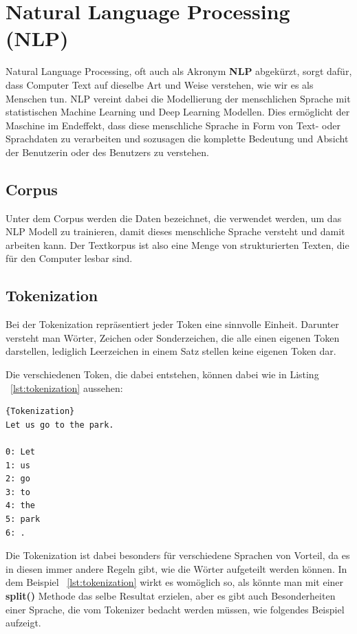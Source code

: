 \section{Natural Language Processing (NLP)}

Natural Language Processing, oft auch als Akronym \textbf{NLP} abgekürzt, sorgt dafür, dass Computer Text auf dieselbe Art und Weise verstehen, wie wir es als Menschen tun.
NLP vereint dabei die Modellierung der menschlichen Sprache mit statistischen Machine Learning und Deep Learning Modellen.
Dies ermöglicht der Maschine im Endeffekt, dass diese menschliche Sprache in Form von Text- oder Sprachdaten zu verarbeiten und sozusagen die komplette Bedeutung und Absicht der Benutzerin oder des Benutzers zu verstehen.\cite{naturalLanguageProcessingIBM}

\subsection{Corpus}

Unter dem Corpus werden die Daten bezeichnet, die verwendet werden, um das NLP Modell zu trainieren, damit dieses menschliche Sprache versteht und damit arbeiten kann.
Der Textkorpus ist also eine Menge von strukturierten Texten, die für den Computer lesbar sind.\cite{corpus}


\subsection{Tokenization}

Bei der Tokenization repräsentiert jeder Token eine sinnvolle Einheit.
Darunter versteht man Wörter, Zeichen oder Sonderzeichen, die alle einen eigenen Token darstellen, lediglich Leerzeichen in einem Satz stellen keine eigenen Token dar.\cite{machineLearningTextAnalysis, naturalLanguageProcessing}

Die verschiedenen Token, die dabei entstehen, können dabei wie in Listing ~\ref{lst:tokenization} aussehen:

\begin{lstlisting}[label={lst:tokenization},caption={Beispiel für die Tokenization}]{Tokenization}
Let us go to the park.

0: Let
1: us
2: go
3: to
4: the
5: park
6: .
\end{lstlisting}

Die Tokenization ist dabei besonders für verschiedene Sprachen von Vorteil, da es in diesen immer andere Regeln gibt, wie die Wörter aufgeteilt werden können.
In dem Beispiel ~\ref{lst:tokenization} wirkt es womöglich so, als könnte man mit einer \textbf{split()} Methode das selbe Resultat erzielen, aber es gibt auch Besonderheiten einer Sprache, die vom Tokenizer bedacht werden müssen, wie folgendes Beispiel aufzeigt.\cite{machineLearningTextAnalysis, naturalLanguageProcessing}

